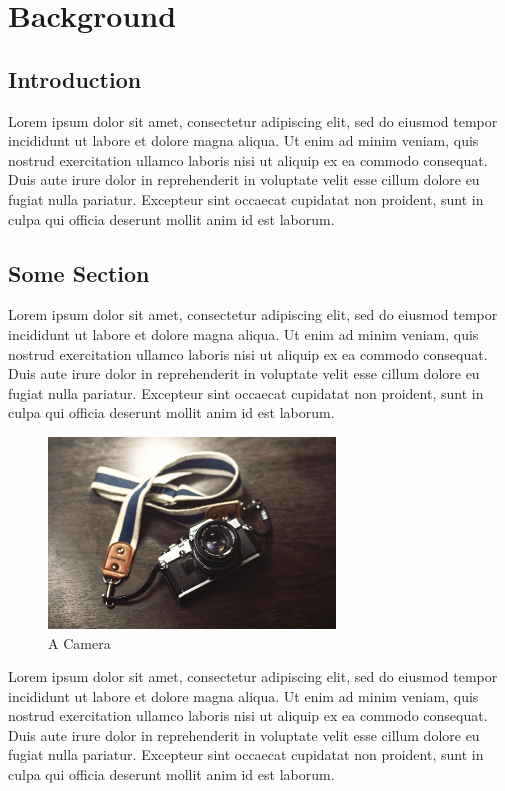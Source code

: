 \chapter{Background}

\section{Introduction}
\noindent Lorem ipsum dolor sit amet, consectetur adipiscing elit, sed do eiusmod tempor incididunt ut labore et dolore magna aliqua. Ut enim ad minim veniam, quis nostrud exercitation ullamco laboris nisi ut aliquip ex ea commodo consequat. Duis aute irure dolor in reprehenderit in voluptate velit esse cillum dolore eu fugiat nulla pariatur. Excepteur sint occaecat cupidatat non proident, sunt in culpa qui officia deserunt mollit anim id est laborum.

\section{Some Section}
\noindent Lorem ipsum dolor sit amet, consectetur adipiscing elit, sed do eiusmod tempor incididunt ut labore et dolore magna aliqua. Ut enim ad minim veniam, quis nostrud exercitation ullamco laboris nisi ut aliquip ex ea commodo consequat. Duis aute irure dolor in reprehenderit in voluptate velit esse cillum dolore eu fugiat nulla pariatur. Excepteur sint occaecat cupidatat non proident, sunt in culpa qui officia deserunt mollit anim id est laborum.

\begin{figure}[H]
        \centering
        \includegraphics[width=3in]{imgs/camera.jpg}
        \caption[A Camera]
        {A Camera}
\end{figure}

\noindent Lorem ipsum dolor sit amet, consectetur adipiscing elit, sed do eiusmod tempor incididunt ut labore et dolore magna aliqua. Ut enim ad minim veniam, quis nostrud exercitation ullamco laboris nisi ut aliquip ex ea commodo consequat. Duis aute irure dolor in reprehenderit in voluptate velit esse cillum dolore eu fugiat nulla pariatur. Excepteur sint occaecat cupidatat non proident, sunt in culpa qui officia deserunt mollit anim id est laborum.

